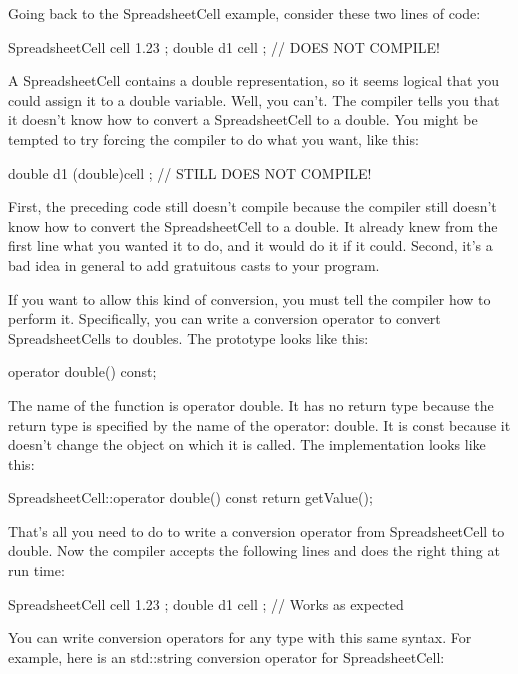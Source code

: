 
Going back to the SpreadsheetCell example, consider these two lines of code:

\begin{cpp}
SpreadsheetCell cell { 1.23 };
double d1 { cell }; // DOES NOT COMPILE!
\end{cpp}

A SpreadsheetCell contains a double representation, so it seems logical that you could assign it to a double variable. Well, you can’t. The compiler tells you that it doesn’t know how to convert a SpreadsheetCell to a double. You might be tempted to try forcing the compiler to do what you want, like this:

\begin{cpp}
double d1 { (double)cell }; // STILL DOES NOT COMPILE!
\end{cpp}

First, the preceding code still doesn’t compile because the compiler still doesn’t know how to convert the SpreadsheetCell to a double. It already knew from the first line what you wanted it to do, and it would do it if it could. Second, it’s a bad idea in general to add gratuitous casts to your program.

If you want to allow this kind of conversion, you must tell the compiler how to perform it. Specifically, you can write a conversion operator to convert SpreadsheetCells to doubles. The prototype looks like this:

\begin{cpp}
operator double() const;
\end{cpp}

The name of the function is operator double. It has no return type because the return type is specified by the name of the operator: double. It is const because it doesn’t change the object on which it is called. The implementation looks like this:

\begin{cpp}
SpreadsheetCell::operator double() const
{
    return getValue();
}
\end{cpp}

That’s all you need to do to write a conversion operator from SpreadsheetCell to double. Now the compiler accepts the following lines and does the right thing at run time:

\begin{cpp}
SpreadsheetCell cell { 1.23 };
double d1 { cell }; // Works as expected
\end{cpp}

You can write conversion operators for any type with this same syntax. For example, here is an std::string conversion operator for SpreadsheetCell:

